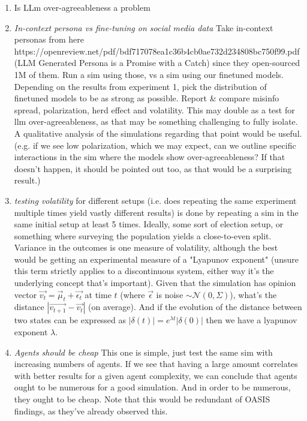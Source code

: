 \documentclass{article} %
\begin{document}
\begin{enumerate}
    \item Is LLm over-agreeableness a problem
    \item \textit{In-context persona vs fine-tuning on social media data} Take in-context personas from here https://openreview.net/pdf/bdf717078ea1c36b4cb0ae732d234808bc750f99.pdf (LLM Generated Persona is a Promise with a Catch) since they open-sourced 1M of them. Run a sim using those, vs a sim using our finetuned models. Depending on the results from experiment 1, pick the distribution of finetuned models to be as strong as possible. Report \& compare misinfo spread, polarization, herd effect and volatility. This may double as a test for llm over-agreeableness, as that may be something challenging to fully isolate. A qualitative analysis of the simulations regarding that point would be useful. (e.g. if we see low polarization, which we may expect, can we outline specific interactions in the sim where the models show over-agreeableness? If that doesn't happen, it should be pointed out too, as that would be a surprising result.)
    \item \textit{testing volatility} for different setups (i.e. does repeating the same experiment multiple times yield vastly different results) is done by repeating a sim in the same initial setup at least 5 times. Ideally, some sort of election setup, or something where surveying the population yields a close-to-even split. Variance in the outcomes is one measure of volatility, although the best would be getting an experimental measure of a "Lyapunov exponent" (unsure this term strictly applies to a discontinuous system, either way it's the underlying concept that's important). Given that the simulation has opinion vector $\vec{v_t}=\vec\mu_t+\vec{\epsilon_t}$ at time $t$ (where $\vec{\epsilon}$ is noise $\sim\mathcal{N}(0, \Sigma)$), what's the distance $|\vec{v_{t+1}}-\vec{v_t}|$ (on average). And if the evolution of the distance between two states can be expressed as $|\delta(t)|=e^{\lambda t}|\delta(0)|$ then we have a lyapunov exponent $\lambda$.
    \item \textit{Agents should be cheap} This one is simple, just test the same sim with increasing numbers of agents. If we see that having a large amount correlates with better results for a given agent complexity, we can conclude that agents ought to be numerous for a good simulation. And in order to be numerous, they ought to be cheap. Note that this would be redundant of OASIS findings, as they've already observed this.

\end{enumerate}
\end{document}
